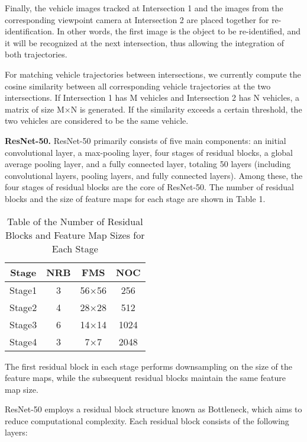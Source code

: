 Finally, the vehicle images tracked at Intersection 1 and the images from the corresponding viewpoint camera at Intersection 2 are placed together for re-identification. 
In other words, the first image is the object to be re-identified, and it will be recognized at the next intersection, thus allowing the integration of both trajectories.

For matching vehicle trajectories between intersections, we currently compute the cosine similarity between all corresponding vehicle trajectories at the two intersections. 
If Intersection 1 has M vehicles and Intersection 2 has N vehicles, a matrix of size M×N is generated. 
If the similarity exceeds a certain threshold, the two vehicles are considered to be the same vehicle.

\textbf{ResNet-50.}
ResNet-50 primarily consists of five main components: an initial convolutional layer, a max-pooling layer, four stages of residual blocks, a global average pooling layer, and a fully connected layer, totaling 50 layers (including convolutional layers, pooling layers, and fully connected layers). 
Among these, the four stages of residual blocks are the core of ResNet-50. 
The number of residual blocks and the size of feature maps for each stage are shown in Table 1.

\begin{table}[t]
	\centering
	\caption{Table of the Number of Residual Blocks and Feature Map Sizes for Each Stage}
	\label{tab:improved}
	\begin{tabular}{|c|c|c|c|}
		\hline
		\multicolumn{1}{|c|}{Stage} & \multicolumn{1}{c|}{NRB} & \multicolumn{1}{c|}{FMS} & \multicolumn{1}{c|}{NOC} \\
		\hline
		Stage1 & 3 & 56×56 & 256 \\
		\hline
		Stage2 & 4 & 28×28 & 512 \\
		\hline
		Stage3 & 6 & 14×14 & 1024 \\
		\hline
		Stage4 & 3 & 7×7 & 2048 \\
		\hline
	\end{tabular}
\end{table}

The first residual block in each stage performs downsampling on the size of the feature maps, while the subsequent residual blocks maintain the same feature map size.

ResNet-50 employs a residual block structure known as Bottleneck, which aims to reduce computational complexity. 
Each residual block consists of the following layers:

